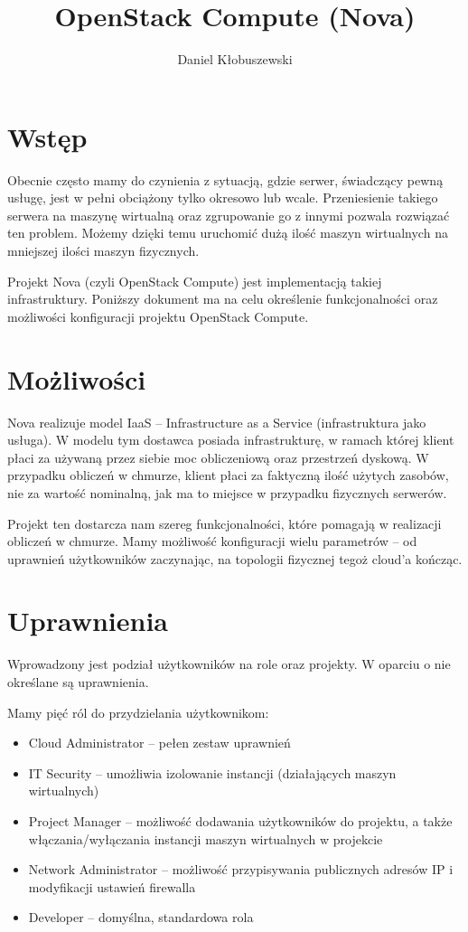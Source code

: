 \documentclass[a4paper,10pt]{article}
\title{OpenStack Compute (Nova)\\[1em]
\large \sc \textls{Opracowanie}}
\author{Daniel Kłobuszewski}
\begin{document}
\maketitle

\section{Wstęp}
Obecnie często mamy do czynienia z sytuacją, gdzie serwer, świadczący pewną usługę, jest w pełni obciążony tylko okresowo lub wcale. Przeniesienie takiego serwera na maszynę wirtualną oraz zgrupowanie go z innymi pozwala rozwiązać ten problem. Możemy dzięki temu uruchomić dużą ilość maszyn wirtualnych na mniejszej ilości maszyn fizycznych.

Projekt Nova (czyli OpenStack Compute) jest implementacją takiej infrastruktury. Poniższy dokument ma na celu określenie funkcjonalności oraz możliwości konfiguracji projektu OpenStack Compute.

\section{Możliwości}
Nova realizuje model IaaS -- Infrastructure as a Service (infrastruktura jako usługa). W modelu tym dostawca posiada infrastrukturę, w ramach której klient płaci za używaną przez siebie moc obliczeniową oraz przestrzeń dyskową. W przypadku obliczeń w chmurze, klient płaci za faktyczną ilość użytych zasobów\cite{hansen11}, nie za wartość nominalną, jak ma to miejsce w przypadku fizycznych serwerów. 

Projekt ten dostarcza nam szereg funkcjonalności, które pomagają w realizacji obliczeń w chmurze. Mamy możliwość konfiguracji wielu parametrów -- od uprawnień użytkowników zaczynając, na topologii fizycznej tegoż cloud'a kończąc.

\section{Uprawnienia}

Wprowadzony jest podział użytkowników na role oraz projekty. W oparciu o nie określane są uprawnienia.

Mamy pięć ról do przydzielania użytkownikom\cite{nova_manual}:

\begin{itemize}
\item Cloud Administrator -- pełen zestaw uprawnień
\item IT Security -- umożliwia izolowanie instancji (działających maszyn wirtualnych)
\item Project Manager -- możliwość dodawania użytkowników do projektu, a także włączania/wyłączania instancji maszyn wirtualnych w projekcie
\item Network Administrator -- możliwość przypisywania publicznych adresów IP i modyfikacji ustawień firewalla
\item Developer -- domyślna, standardowa rola
\end{itemize}
\end{document}

